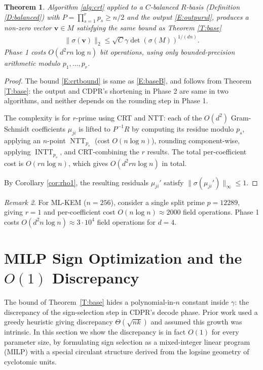 \documentclass[11pt,a4paper]{article}
\theoremstyle{plain}
\newtheorem{theorem}{Theorem}[section]
\theoremstyle{definition}
\theoremstyle{remark}
\newtheorem{remark}[theorem]{Remark}
\DeclareMathOperator{\NTT}{NTT}
\DeclareMathOperator{\INTT}{INTT}
\begin{document}
\begin{theorem}\label{T:crt}
Algorithm \ref{alg:crt} applied to a $C$-balanced $R$-basis (Definition \ref{D:balanced}) with $P=\prod_{s=1}^r p_s\ge n/2$ and the output \eqref{E:outpurul}, produces a non-zero vector $\mathbf{v}\in M$ satisfying the same bound as Theorem \ref{T:base} 
\begin{align}
    \|\sigma(\mathbf{v})\|_2 \le
    \sqrt{C}\gamma\det(\sigma(M))^{1/(dn)}.
    \label{E:crtbound}
\end{align}
Phase 1 costs $O(d^2 r n\log n)$ bit operations, using only bounded-precision arithmetic modulo $p_1, \dots, p_r$.
\end{theorem}

\begin{proof}
The bound \eqref{E:crtbound} is same as \eqref{E:baseB}, and follows from Theorem \ref{T:base}: the output and CDPR's shortening in Phase 2 are same in two algorithms, and neither depends on the rounding step in Phase 1. 
  
The complexity is for $r$-prime using CRT and NTT: each of the $O(d^2)$ Gram-Schmidt coefficients $\mu_{ji}$ is lifted to $P^{-1}R$ by computing its residue modulo $p_s$, applying an $n$-point $\NTT_{p_s}$ (cost $O(n\log n)$), rounding component-wise, applying $\INTT_{p_s}$, and CRT-combining the $r$ results. The total per-coefficient cost is $O(rn\log n)$, which gives $O(d^2 r n\log n)$ in total. 
  
By Corollary \ref{cor:rho1}, the resulting residuals $\mu_{ji}'$ satisfy $\|\sigma(\mu_{ji}')\|_\infty\le 1$.
\end{proof}

\begin{remark}\label{rem:crtpra}
For ML-KEM ($n=256$), consider a single split prime $p=12289$, giving $r=1$ and per-coefficient cost $O(n\log n)\approx 2000$ field operations. Phase 1 costs $O(d^2 n\log n)\approx 3\cdot 10^4$ field operations for $d=4$.
\end{remark}

\section{MILP Sign Optimization and the $O(1)$ Discrepancy}\label{sec:milp}

The bound of Theorem~\ref{T:base} hides a polynomial-in-$n$ constant inside $\gamma$: the discrepancy of the sign-selection step in CDPR's decode phase. Prior work used a greedy heuristic giving discrepancy $\Theta(\sqrt{nk})$ and assumed this growth was intrinsic. In this section we show the discrepancy is in fact $O(1)$ for every parameter size, by formulating sign selection as a mixed-integer linear program (MILP) with a special circulant structure derived from the logsine geometry of cyclotomic units.
\end{document}
